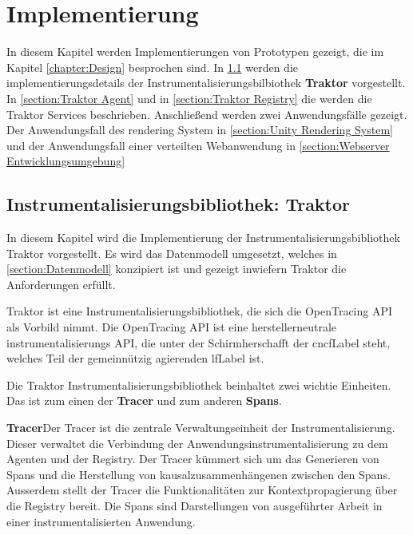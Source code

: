 %
\chapter{Implementierung}
\label{chapter:Implementierung}

In diesem Kapitel werden Implementierungen von Prototypen gezeigt, die im Kapitel \cref{chapter:Design} besprochen sind. In \cref{section:Instrumentalisierungsbibliothek: Traktor} werden die implementierungsdetails der Instrumentalisierungsbilbiothek \textbf{Traktor} vorgestellt. In \cref{section:Traktor Agent} und in \cref{section:Traktor Registry} die werden die Traktor Services beschrieben. Anschließend werden zwei Anwendungsfälle gezeigt. Der Anwendungsfall des rendering System in \cref{section:Unity Rendering System} und der Anwendungsfall einer verteilten Webanwendung in \cref{section:Webserver Entwicklungsumgebung}

\section{Instrumentalisierungsbibliothek: Traktor}
\label{section:Instrumentalisierungsbibliothek: Traktor}
In diesem Kapitel wird die Implementierung der Instrumentalisierungsbibliothek Traktor vorgestellt. Es wird das Datenmodell umgesetzt, welches in \cref{section:Datenmodell} konzipiert ist und gezeigt inwiefern Traktor die Anforderungen erfüllt.

Traktor ist eine Instrumentalisierungsbibliothek, die sich die OpenTracing API als Vorbild nimmt. Die OpenTracing API ist eine herstellerneutrale instrumentalisierungs API, die unter der Schirmherschafft der \gls{cncfLabel} steht, welches Teil der gemeinnützig agierenden \gls{lfLabel} ist.

Die Traktor Instrumentalisierungsbibliothek beinhaltet zwei wichtie Einheiten. Das ist zum einen der \textbf{Tracer} und zum anderen \textbf{Spans}. 

\textbf{Tracer}\space\space\space Der Tracer ist die zentrale Verwaltungseinheit der Instrumentalisierung. Dieser verwaltet die Verbindung der Anwendungsinstrumentalisierung zu dem Agenten und der Registry. Der Tracer kümmert sich um das Generieren von Spans und die Herstellung von kausalzusammenhängenen zwischen den Spans. Ausserdem stellt der Tracer die Funktionalitäten zur Kontextpropagierung über die Registry bereit. Die Spans sind Darstellungen von ausgeführter Arbeit in einer instrumentalisierten Anwendung. 

